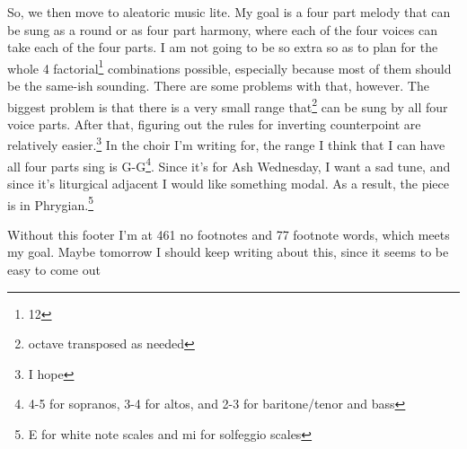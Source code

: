 \documentclass[12pt]{article}[titlepage]
\newcommand{\1}{\={a}}
\newcommand{\2}{\={e}}
\newcommand{\3}{\={\i}}
\newcommand{\4}{\=o}
\newcommand{\5}{\=u}
\newcommand{\6}{\={A}}
\renewcommand{\,}{\textsuperscript{,}}
\begin{document}
So, we then move to aleatoric music lite.
My goal is a four part melody that can be sung as a round or as four part harmony, where each of the four voices can take each of the four parts.
I am not going to be so extra so as to plan for the whole 4 factorial\footnote{12} combinations possible, especially because most of them should be the same-ish sounding.
There are some problems with that, however.
The biggest problem is that there is a very small range that\footnote{octave transposed as needed} can be sung by all four voice parts.
After that, figuring out the rules for inverting counterpoint are relatively easier.\footnote{I hope}
In the choir I'm writing for, the range I think that I can have all four parts sing is G-G\footnote{4-5 for sopranos, 3-4 for altos, and 2-3 for baritone/tenor and bass}.
Since it's for Ash Wednesday, I want a sad tune, and since it's liturgical adjacent I would like something modal.
As a result, the piece is in Phrygian.\footnote{E for white note scales and mi for solfeggio scales}

Without this footer I'm at 461 no footnotes and 77 footnote words, which meets my goal. Maybe tomorrow I should keep writing about this, since it seems to be easy to come out
\end{document}
